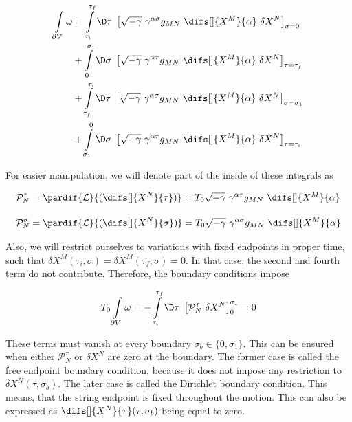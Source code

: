 \begin{equation}
\label{eq:boundary_integrals}
    \begin{aligned}
    \int\limits_{\partial V} \omega  & = 
    \int\limits_{\tau_i}^{\tau_f} \D \tau ~ \left[ \sqrt{-\gamma} ~ \gamma^{\alpha \sigma} g_{M N} ~ \difs[] {X^{M}} {\alpha} ~ \delta X^{N} \right]_{\sigma = 0} \\
    & + \int\limits_{0}^{\sigma_1} \D \sigma ~ \left[ \sqrt{-\gamma} ~ \gamma^{\alpha \tau} g_{M N} ~ \difs[] {X^{M}} {\alpha} ~ \delta X^{N} \right]_{\tau = \tau_f} \\
    & +\int\limits_{\tau_f}^{\tau_i} \D \tau ~ \left[ \sqrt{-\gamma} ~ \gamma^{\alpha \sigma} g_{M N} ~ \difs[] {X^{M}} {\alpha} ~ \delta X^{N} \right]_{\sigma = \sigma_1} \\
    & + \int\limits_{\sigma_1}^{0} \D \sigma ~ \left[ \sqrt{-\gamma} ~ \gamma^{\alpha \tau} g_{M N} ~ \difs[] {X^{M}} {\alpha} ~ \delta X^{N} \right]_{\tau = \tau_i}
    \end{aligned}
\end{equation}

\noindent
For easier manipulation, we will denote part of the inside of these integrals as

\begin{align}
\label{eq:denote_p}
    \mathcal{P}^{\tau}_{N} & = \pardif{\mathcal{L}}{(\difs[]{X^N}{\tau})} = T_0 \sqrt{-\gamma} ~ \gamma^{\alpha \tau} g_{M N} ~ \difs[] {X^{M}} {\alpha} \\[10pt]
    \mathcal{P}^{\sigma}_{N} & = \pardif{\mathcal{L}}{(\difs[]{X^N}{\sigma})} = T_0 \sqrt{-\gamma} ~ \gamma^{\alpha \sigma} g_{M N} ~ \difs[] {X^{M}} {\alpha}
\end{align}

\noindent
Also, we will restrict ourselves to variations with fixed endpoints in proper time, such that $\delta X^M (\tau_i, \sigma) = \delta X^M (\tau_f, \sigma) = 0$. In that case, the second and fourth term do not contribute. Therefore, the boundary conditions impose

\begin{equation}
\label{eq:boundary_integrals_compact}
    T_0 \int\limits_{\partial V} \omega = - \int\limits_{\tau_i}^{\tau_f} \D \tau ~ \left[ \mathcal{P}^{\tau}_{N} ~ \delta X^{N} \right]_{0}^{\sigma_1} = 0
\end{equation}

\noindent
These terms must vanish at every boundary $\sigma_b \in \{0, \sigma_1 \}$. This can be ensured when either $\mathcal{P}^{\tau}_{N}$ or $\delta X^{N}$ are zero at the boundary. The former case is called the free endpoint boundary condition, because it does not impose any restriction to $\delta X^N(\tau, \sigma_b)$. The later case is called the Dirichlet boundary condition. This means, that the string endpoint is fixed throughout the motion. This can also be expressed as $\difs[]{X^N}{\tau}(\tau, \sigma_b)$ being equal to zero.

